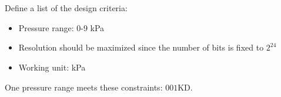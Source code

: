 
\section{}
Define a list of the design criteria:
\begin{itemize}
    \item Pressure range: 0-9 kPa
    \item Resolution should be maximized since the number of bits is fixed to $2^{24}$
    \item Working unit: kPa
\end{itemize}

One pressure range meets these constraints: $\boxed{\text{001KD}}$.   

